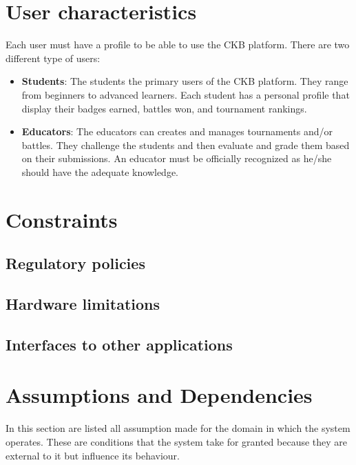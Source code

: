 \section{User characteristics}
Each user must have a profile to be able to use the CKB platform.
There are two different type of users:
\begin{itemize}
	\item \textbf{Students}:
	    The students the primary users of the CKB platform. They range from beginners to advanced learners. Each student has a personal profile that display their badges earned, battles won, and tournament rankings. 
	\item \textbf{Educators}: 
		The educators can creates and manages tournaments and/or battles. They challenge the students and then evaluate and grade them based on their submissions. An educator must be officially recognized as he/she should have the adequate knowledge.
\end{itemize}

\section{Constraints}
\subsection{Regulatory policies}
\subsection{Hardware limitations}
\subsection{Interfaces to other applications}

\clearpage

\section{Assumptions and Dependencies}
In this section are listed all assumption made for the domain in which the system operates. These are conditions that the system take for granted because they are external to it but influence its behaviour.

